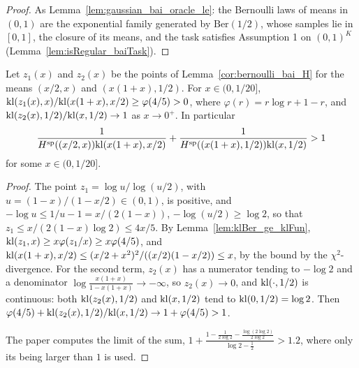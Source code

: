 \begin{proof}
  \leanok
  As Lemma~\ref{lem:gaussian_bai_oracle_le}: the Bernoulli laws of means in $(0, 1)$ are the
  exponential family generated by $\mathrm{Ber}(1/2)$, whose samples lie in $[0, 1]$, the closure of its
  means, and the task satisfies Assumption 1 on $(0, 1)^K$ (Lemma~\ref{lem:isRegular_baiTask}).
\end{proof}

\begin{lemma}
  \label{lem:bernoulli_limit}
  \leanok
  Let $z_1(x)$ and $z_2(x)$ be the points of Lemma~\ref{cor:bernoulli_bai_H} for the means
  $(x/2, x)$ and $(x(1 + x), 1/2)$. For $x \in (0, 1/20]$,
  $\mathrm{kl}(z_1(x), x) / \mathrm{kl}(x(1 + x), x/2) \ge \varphi(4/5) > 0$, where $\varphi(r) = r \log r + 1 - r$,
  and $\mathrm{kl}(z_2(x), 1/2) / \mathrm{kl}(x, 1/2) \to 1$ as $x \to 0^+$. In particular
  \[ \frac{1}{H^{\mathrm{sp}}((x/2, x)) \mathrm{kl}(x(1 + x), x/2)} + \frac{1}{H^{\mathrm{sp}}((x(1 + x), 1/2)) \mathrm{kl}(x, 1/2)}
    > 1 \]
  for some $x \in (0, 1/20]$.
\end{lemma}

\begin{proof}
  \leanok
  The point $z_1 = \log u / \log(u/2)$, with $u = (1 - x)/(1 - x/2) \in (0, 1)$, is positive, and
  $-\log u \le 1/u - 1 = x / (2(1 - x))$, $-\log(u/2) \ge \log 2$, so that
  $z_1 \le x / (2 (1 - x) \log 2) \le 4x/5$. By Lemma~\ref{lem:klBer_ge_klFun},
  $\mathrm{kl}(z_1, x) \ge x \varphi(z_1 / x) \ge x \varphi(4/5)$, and
  $\mathrm{kl}(x(1 + x), x/2) \le (x/2 + x^2)^2 / ((x/2)(1 - x/2)) \le x$, by the bound by the
  $\chi^2$-divergence. For the second term, $z_2(x)$ has a numerator tending to $-\log 2$ and a
  denominator $\log \frac{x(1 + x)}{1 - x(1 + x)} \to -\infty$, so $z_2(x) \to 0$, and
  $\mathrm{kl}(\cdot, 1/2)$ is continuous: both $\mathrm{kl}(z_2(x), 1/2)$ and $\mathrm{kl}(x, 1/2)$ tend to
  $\mathrm{kl}(0, 1/2) = \log 2$. Then $\varphi(4/5) + \mathrm{kl}(z_2(x), 1/2) / \mathrm{kl}(x, 1/2) \to 1 + \varphi(4/5)
  > 1$.

  The paper computes the limit of the sum, $1 + \frac{1 - \frac{1}{2 \log 2} - \frac{\log(2 \log
  2)}{2 \log 2}}{\log 2 - \frac12} > 1.2$, where only its being larger than $1$ is used.
\end{proof}

